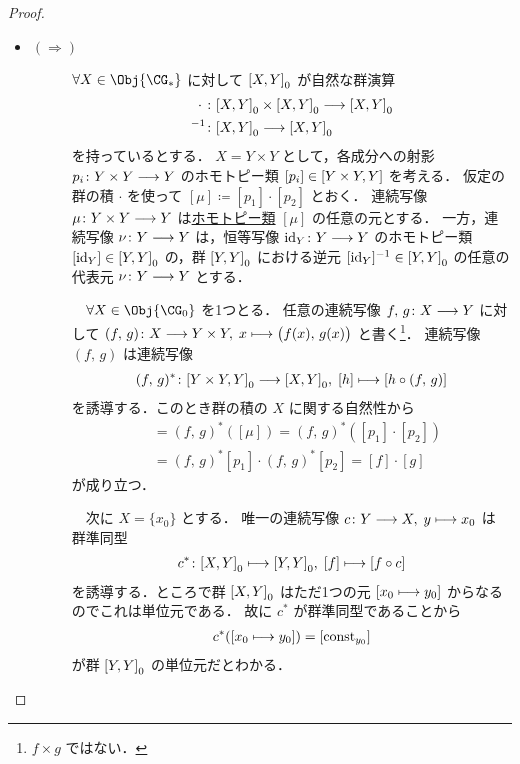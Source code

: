 \documentclass[algtopo_main]{subfiles}
\begin{document}
\begin{proof}
    \begin{itemize}
        \item 
        \begin{description}
            \item[\textbf{$\bm{(\Longrightarrow)}$}] $\forall X \in \Obj{\CG_*}$ に対して $\comm{X}{Y}_0$ が自然な群演算
            \begin{align}
                \cdot \; &\colon \comm{X}{Y}_0 \times \comm{X}{Y}_0 \lto \comm{X}{Y}_0 \\
                {}^{-1} &\colon \comm{X}{Y}_0 \lto \comm{X}{Y}_0
            \end{align}
            を持っているとする．
            $X = Y \times Y$ として，各成分への射影 $p_i \colon Y \times Y \longrightarrow Y$ のホモトピー類 $[p_i] \in \comm{Y\times Y}{Y}$ を考える．
            仮定の群の積 $\cdot$ を使って $[\mu] \coloneqq [p_1] \cdot [p_2]$ とおく．
            連続写像 $\mu \colon Y \times Y \longrightarrow Y$ は\hyperref[def:homotopy-basic]{ホモトピー類} $[\mu]$ の任意の元とする．
            一方，連続写像 $\nu \colon Y \longrightarrow Y$ は，恒等写像 $\mathrm{id}_Y \colon Y \longrightarrow Y$ のホモトピー類 $[\mathrm{id}_Y] \in \comm{Y}{Y}_0$ の，群 $\comm{Y}{Y}_0$ における逆元 $[\mathrm{id}_Y]^{-1} \in \comm{Y}{Y}_0$ の任意の代表元 $\nu \colon Y \longrightarrow Y$ とする．
            
            　$\forall X \in \Obj{\CG_0}$ を1つとる．
            任意の連続写像 $f,\, g \colon X \longrightarrow Y$ に対して $(f,\, g) \colon X \longrightarrow Y \times Y,\; x \longmapsto \bigl( f(x),\, g(x) \bigr)$ と書く\footnote{$f \times g$ ではない．}．
            連続写像 $(f,\, g)$ は連続写像
            \begin{align}
                (f,\, g)^* \colon \comm{Y \times Y}{Y}_0 \lto \comm{X}{Y}_0,\; [h] \lmto [h \circ (f,\, g)]
            \end{align}
            を誘導する．このとき群の積の $X$ に関する自然性から
            \begin{align}
                [\mu \circ (f,\, g)] &= (f,\, g)^*([\mu]) = (f,\, g)^*([p_1] \cdot [p_2]) \\
                &= (f,\, g)^*[p_1] \cdot  (f,\, g)^*[p_2] = [f] \cdot [g] \label{Hspace-mult}
            \end{align}
            が成り立つ．
            
            　次に $X = \{x_0\}$ とする．
            唯一の連続写像 $c \colon Y \longrightarrow X,\; y \longmapsto x_0$ は
            群準同型
            \begin{align}
                c^* \colon \comm{X}{Y}_0 \lmto \comm{Y}{Y}_0,\; [f] \lmto [f \circ c]
            \end{align}
            を誘導する．ところで群 $\comm{X}{Y}_0$ はただ1つの元 $[x_0 \longmapsto y_0]$ からなるのでこれは単位元である．
            故に $c^*$ が群準同型であることから
            \begin{align}
                c^*([x_0 \longmapsto y_0]) = [\mathrm{const}_{y_0}]
            \end{align}
            が群 $\comm{Y}{Y}_0$ の単位元だとわかる．


\end{description}
\end{itemize}
\end{proof}
\end{document}
